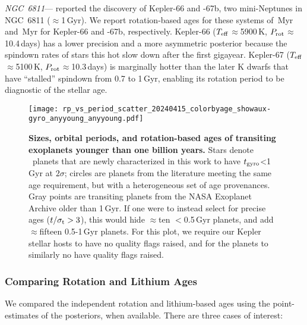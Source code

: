 \documentclass[11pt,twocolumn,tighten]{aastex63}
\begin{document}
{\it NGC~6811}---\citet{Meibom_2013} reported the discovery of Kepler-66 and -67b, two
mini-Neptunes in NGC~6811 ($\approx$1\,Gyr).  We report rotation-based
ages for these systems of \kepsixsixtgyro\,Myr and \kepsixseventgyro\,Myr for
Kepler-66 and -67b, respectively.  Kepler-66 ($T_{\rm
eff}$$\approx$5900\,K, $P_{\rm rot}$$\approx$10.4\,days) has a lower
precision and a more asymmetric posterior because the spindown rates
of stars this hot slow down after the first gigayear.
Kepler-67 ($T_{\rm eff}$$\approx$5100\,K, $P_{\rm
rot}$$\approx$10.3\,days) is marginally hotter than the later K dwarfs
that have ``stalled'' spindown from 0.7 to 1\,Gyr, enabling its
rotation period to be diagnostic of the stellar age.

\begin{figure}[!t]
  \begin{center}
    \texttt{[image: rp\_vs\_period\_scatter\_20240415\_colorbyage\_showaux-gyro\_anyyoung\_anyyoung.pdf]}
  \end{center}
  \vspace{-0.5cm}
  \caption{
    {\bf Sizes, orbital periods, and rotation-based ages of transiting
    exoplanets younger than one billion years.} Stars denote
    \nplyounggyrotwosigmanograzingnoruwe\ planets that are newly
    characterized in this work to have $t_{\rm gyro}$<1\,Gyr at
    $2$$\sigma$; circles are planets from the literature meeting the
    same age requirement, but with a heterogeneous set of age
    provenances.  Gray points are transiting planets from the NASA
    Exoplanet Archive older than 1\,Gyr.  If one were to instead select for
    precise ages ($t/\sigma_{\rm t}>3$), this would hide $\approx$ten
    $<$0.5\,Gyr planets, and add $\approx$fifteen 0.5-1\,Gyr planets.
    For this plot, we require our Kepler stellar hosts to have no
    quality flags raised, and for the planets to
    similarly no have quality flags raised. 
    \label{fig:rp_period_age_results}
  }
\end{figure}

\subsubsection{Comparing Rotation and Lithium Ages}

We compared the independent rotation and lithium-based ages using the
point-estimates of the posteriors, when available.  There are three
cases of interest:
\end{document}
